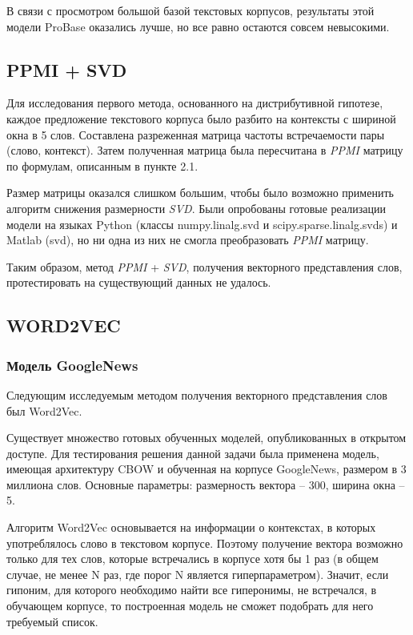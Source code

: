 В связи с просмотром большой базой текстовых корпусов, результаты этой модели ProBase оказались лучше, но все равно остаются совсем невысокими.



\subsection{PPMI + SVD}

Для исследования первого метода, основанного на дистрибутивной гипотезе, каждое
предложение текстового корпуса было разбито на контексты с шириной окна в 5 слов.
Составлена разреженная матрица частоты встречаемости пары (слово, контекст). Затем
полученная матрица была пересчитана в \textit{PPMI} матрицу по формулам, описанным в пункте
2.1.

Размер матрицы оказался слишком большим, чтобы было возможно применить алгоритм
снижения размерности \textit{SVD}. Были опробованы готовые реализации модели на языках
Python (классы numpy.linalg.svd и scipy.sparse.linalg.svds) и Matlab (svd), но ни одна из них не смогла преобразовать \textit{PPMI} матрицу.

Таким образом, метод \textit{PPMI} + \textit{SVD}, получения векторного представления слов,
протестировать на существующий данных не удалось.





\subsection{WORD2VEC}

\subsubsection{Модель GoogleNews}

Следующим исследуемым методом получения векторного представления слов был
Word2Vec.

Существует множество готовых обученных моделей, опубликованных в открытом доступе.
Для тестирования решения данной задачи была применена модель, имеющая архитектуру
CBOW и обученная на корпусе GoogleNews, размером в 3 миллиона слов. Основные
параметры: размерность вектора – 300, ширина окна – 5.

Алгоритм Word2Vec основывается на информации о контекстах, в которых употреблялось
слово в текстовом корпусе. Поэтому получение вектора возможно только для тех слов,
которые встречались в корпусе хотя бы 1 раз (в общем случае, не менее N раз, где порог N
является гиперпараметром). Значит, если гипоним, для которого необходимо найти все
гиперонимы, не встречался, в обучающем корпусе, то построенная модель не сможет
подобрать для него требуемый список.

